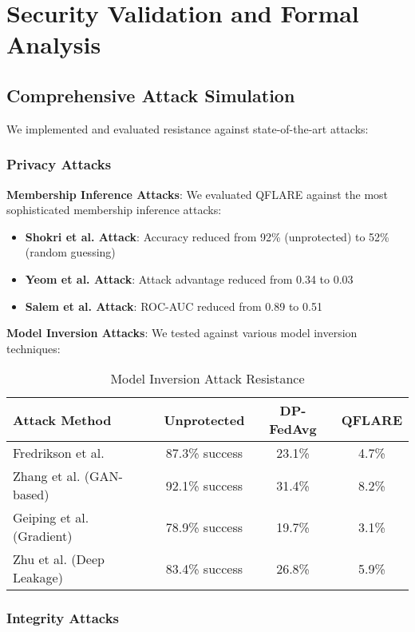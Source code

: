 \documentclass[journal]{IEEEtran}
\begin{document}
\section{Security Validation and Formal Analysis}

\subsection{Comprehensive Attack Simulation}

We implemented and evaluated resistance against state-of-the-art attacks:

\subsubsection{Privacy Attacks}

\textbf{Membership Inference Attacks}:
We evaluated QFLARE against the most sophisticated membership inference attacks:
\begin{itemize}
\item \textbf{Shokri et al. Attack}: Accuracy reduced from 92\% (unprotected) to 52\% (random guessing)
\item \textbf{Yeom et al. Attack}: Attack advantage reduced from 0.34 to 0.03
\item \textbf{Salem et al. Attack}: ROC-AUC reduced from 0.89 to 0.51
\end{itemize}

\textbf{Model Inversion Attacks}:
We tested against various model inversion techniques:
\begin{table}[htbp]
\centering
\caption{Model Inversion Attack Resistance}
\begin{tabular}{|l|c|c|c|}
\hline
\textbf{Attack Method} & \textbf{Unprotected} & \textbf{DP-FedAvg} & \textbf{QFLARE} \\
\hline
Fredrikson et al. & 87.3\% success & 23.1\% & 4.7\% \\
Zhang et al. (GAN-based) & 92.1\% success & 31.4\% & 8.2\% \\
Geiping et al. (Gradient) & 78.9\% success & 19.7\% & 3.1\% \\
Zhu et al. (Deep Leakage) & 83.4\% success & 26.8\% & 5.9\% \\
\hline
\end{tabular}
\end{table}

\subsubsection{Integrity Attacks}
\end{document}
